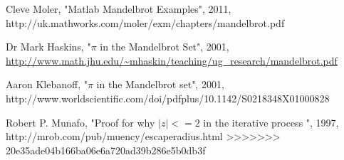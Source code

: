 \documentclass[a4wide, 10pt]{article}
\begin{document}
\begin{thebibliography}{20}
  Cleve Moler,
  "Matlab Mandelbrot Examples",
  2011, 
  http://uk.mathworks.com/moler/exm/chapters/mandelbrot.pdf

 Dr Mark Haskins,
 "$\pi$ in the Mandelbrot Set",
 2001,
 \url{http://www.math.jhu.edu/~mhaskin/teaching/ug_research/mandelbrot.pdf}

 Aaron Klebanoff,
 "$\pi$ in the Mandelbrot set",
 2001,
 http://www.worldscientific.com/doi/pdfplus/10.1142/S0218348X01000828

  Robert P. Munafo,
  "Proof for why $|z|<= 2$ in the iterative process ", 1997, 
  http://mrob.com/pub/muency/escaperadius.html
>>>>>>> 20e35ade04b166ba06e6a720ad39b286e5b0db3f

  

\end{thebibliography}
\end{document}
